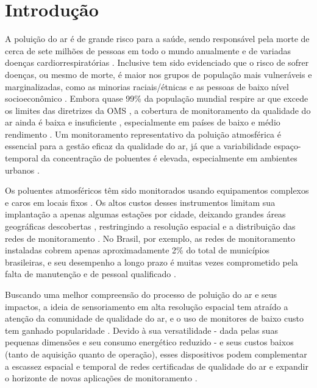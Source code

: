 
\chapter*{Introdução}
{}%
%

A poluição do ar é de grande risco para a saúde, sendo responsável pela morte de cerca de sete milhões de pessoas em todo o mundo anualmente e de variadas doenças cardiorrespiratórias \cite{who2021}. Inclusive tem sido evidenciado que o risco de sofrer doenças, ou mesmo de morte, é maior nos grupos de população mais vulneráveis e marginalizadas, como as minorias raciais/étnicas e as pessoas de baixo nível socioeconômico \cite{Jbaily2022AirGroups}. Embora quase 99\% da população mundial respire ar que excede os limites das diretrizes da OMS \cite{who2021}, a cobertura de monitoramento da qualidade do ar ainda é baixa e insuficiente \cite{Munir2019AnalysingSheffield}, especialmente em países de baixo e médio rendimento \cite{Vormittag2021AnaliseBrasil,Ferreira2022}. Um monitoramento representativo da poluição atmosférica é essencial para a gestão eficaz da qualidade do ar, já que a variabilidade espaço-temporal da concentração de poluentes é elevada, especialmente em ambientes urbanos \cite{Kumar2015,Mead2013TheNetworks}.

Os poluentes atmosféricos têm sido monitorados usando equipamentos complexos e caros em locais fixos \cite{Kang2022PerformanceReview}. Os altos custos desses instrumentos limitam sua implantação a apenas algumas estações por cidade, deixando grandes áreas geográficas descobertas \cite{Munir2019AnalysingSheffield}, restringindo a resolução espacial e a distribuição das redes de monitoramento \cite{Jiao2016CommunityStates,Kumar2015}. No Brasil, por exemplo, as redes de monitoramento instaladas cobrem apenas aproximadamente 2\% do total de municípios brasileiras, e seu desempenho a longo prazo é muitas vezes comprometido pela falta de manutenção e de pessoal qualificado \cite{Vormittag2021AnaliseBrasil}.

Buscando uma melhor compreensão do processo de poluição do ar e seus impactos, a ideia de sensoriamento em alta resolução espacial tem atraído a atenção da comunidade de qualidade do ar, e o uso de monitores de baixo custo tem ganhado popularidade \cite{Motlagh2020TowardMonitoring,Kumar2015}. Devido à sua versatilidade - dada pelas suas pequenas dimensões e seu consumo energético reduzido \cite{Lewis2018Low-costApplications} - e seus custos baixos (tanto de aquisição quanto de operação), esses dispositivos podem complementar a escassez espacial e temporal de redes certificadas de qualidade do ar e expandir o horizonte de novas aplicações de monitoramento \cite{Lewis2016EvaluatingResearch}. 


